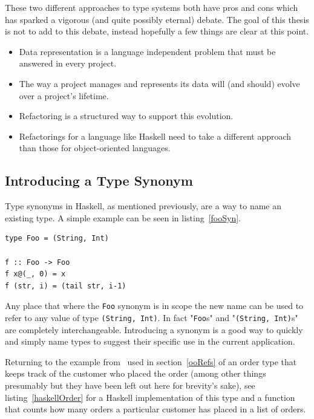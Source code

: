 These two different approaches to type systems both have pros and cons which has sparked a vigorous (and quite possibly eternal) debate. The goal of this thesis is not to add to this debate, instead hopefully a few things are clear at this point.

\begin{itemize}
	\item Data representation is a language independent problem that must be answered in every project.
	\item The way a project manages and represents its data will (and should) evolve over a project's lifetime.
	\item Refactoring is a structured way to support this evolution.
	\item Refactorings for a language like Haskell need to take a different approach than those for object-oriented languages.
\end{itemize} 

\subsection{Introducing a Type Synonym}\label{introSyn}

Type synonyms in Haskell, as mentioned previously, are a way to name an existing type. A simple example can be seen in listing~\ref{fooSyn}. 

\begin{lstlisting}[label=fooSyn,caption={A simple type synonym.}]
type Foo = (String, Int)

f :: Foo -> Foo
f x@(_, 0) = x
f (str, i) = (tail str, i-1) 
\end{lstlisting}

Any place that where the \texttt{Foo} synonym is in scope the new name can be used to refer to any value of type \texttt{(String, Int)}. In fact "\texttt{Foo}s" and "\texttt{(String, Int)}s" are completely interchangeable. Introducing a synonym is a good way to quickly and simply name types to suggest their specific use in the current application.

Returning to the example from~\citep{fowler} used in section~\ref{ooRefs} of an order type that keeps track of the customer who placed the order (among other things presumably but they have been left out here for brevity's sake), see listing~\ref{haskellOrder} for a Haskell implementation of this type and a function that counts how many orders a particular customer has placed in a list of orders.

